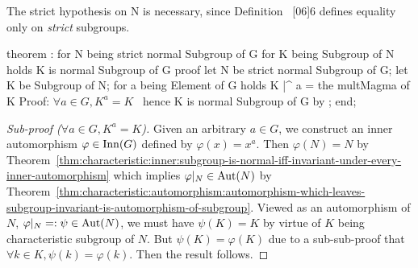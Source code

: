 \begin{thm-remark}
The {\Tt{}strict\nwendquote} hypothesis on {\Tt{}N\nwendquote} is necessary, since Definition~%
[06]{6} defines equality only on \emph{strict} subgroups.
\end{thm-remark}

\nwenddocs{}\endmoddef\nwstartdeflinemarkup{}\nwenddeflinemarkup
theorem :
  for N being strict normal Subgroup of G
  for K being  Subgroup of N
  holds K is normal Subgroup of G
proof
  let N be strict normal Subgroup of G;
  let K be  Subgroup of N;
  for a being Element of G holds K |^ a = the multMagma of K
  \LA{}Proof: $\forall a\in G, K^{a}=K$~{\nwtagstyle{}}\RA{}
  hence K is normal Subgroup of G by ;
end;
\eatline
{}\nwendcode{}\nwdocspar
\begin{proof}[Sub-proof ($\forall a\in G, K^{a}=K$)]
Given an arbitrary $a\in G$, we construct an inner automorphism
$\varphi\in\operatorname{Inn}(G)$ defined by $\varphi(x)=x^{a}$. Then $\varphi(N)=N$
by Theorem~\ref{thm:characteristic:inner:subgroup-is-normal-iff-invariant-under-every-inner-automorphism}
which implies $\varphi|_{N}\in\operatorname{Aut}(N)$ by Theorem~\ref{thm:characteristic:automorphism:automorphism-which-leaves-subgroup-invariant-is-automorphism-of-subgroup}.
Viewed
as an automorphism of $N$, $\varphi|_{N}=:\psi\in\operatorname{Aut}(N)$, we must have
$\psi(K)=K$ by virtue of $K$ being characteristic subgroup of $N$. But
$\psi(K)=\varphi(K)$ due to a sub-sub-proof that $\forall k\in K,\psi(k)=\varphi(k)$.
Then the result follows.
\end{proof}

